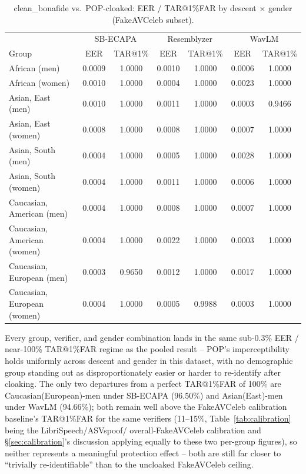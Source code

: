 \documentclass[11pt]{article}
\begin{document}
\begin{table}[H]
\centering
\caption{clean\_bonafide vs.\ POP-cloaked: EER / TAR@1\%FAR by descent
$\times$ gender (FakeAVCeleb subset).}
\label{tab:ablation}
\begin{tabular}{lcccccc}
\toprule
& \multicolumn{2}{c}{SB-ECAPA} & \multicolumn{2}{c}{Resemblyzer} & \multicolumn{2}{c}{WavLM} \\
Group & EER & TAR@1\% & EER & TAR@1\% & EER & TAR@1\% \\
\midrule
African (men)               & 0.0009 & 1.0000 & 0.0010 & 1.0000 & 0.0006 & 1.0000 \\
African (women)              & 0.0010 & 1.0000 & 0.0004 & 1.0000 & 0.0023 & 1.0000 \\
Asian, East (men)            & 0.0010 & 1.0000 & 0.0011 & 1.0000 & 0.0003 & 0.9466 \\
Asian, East (women)          & 0.0008 & 1.0000 & 0.0008 & 1.0000 & 0.0007 & 1.0000 \\
Asian, South (men)           & 0.0004 & 1.0000 & 0.0005 & 1.0000 & 0.0028 & 1.0000 \\
Asian, South (women)         & 0.0004 & 1.0000 & 0.0011 & 1.0000 & 0.0006 & 1.0000 \\
Caucasian, American (men)    & 0.0004 & 1.0000 & 0.0008 & 1.0000 & 0.0007 & 1.0000 \\
Caucasian, American (women)  & 0.0004 & 1.0000 & 0.0022 & 1.0000 & 0.0003 & 1.0000 \\
Caucasian, European (men)    & 0.0003 & 0.9650 & 0.0012 & 1.0000 & 0.0017 & 1.0000 \\
Caucasian, European (women)  & 0.0004 & 1.0000 & 0.0005 & 0.9988 & 0.0003 & 1.0000 \\
\bottomrule
\end{tabular}
\end{table}

Every group, verifier, and gender combination lands in the same
sub-0.3\% EER / near-100\% TAR@1\%FAR regime as the pooled result --
POP's imperceptibility holds uniformly across descent and gender in
this dataset, with no demographic group standing out as
disproportionately easier or harder to re-identify after cloaking. The
only two departures from a perfect TAR@1\%FAR of 100\% are
Caucasian(European)-men under SB-ECAPA (96.50\%) and
Asian(East)-men under WavLM (94.66\%); both remain well above the
FakeAVCeleb calibration baseline's TAR@1\%FAR for the same verifiers
(11--15\%, Table~\ref{tab:calibration} being the LibriSpeech/ASVspoof/
overall-FakeAVCeleb calibration and \S\ref{sec:calibration}'s
discussion applying equally to these two per-group figures), so neither
represents a meaningful protection effect -- both are still far closer
to ``trivially re-identifiable'' than to the uncloaked FakeAVCeleb
ceiling.
\end{document}
